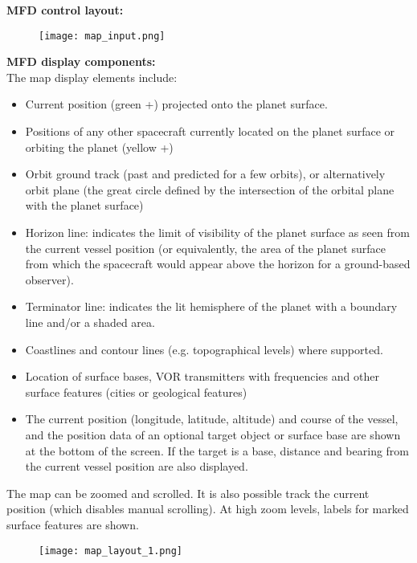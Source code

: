 \documentclass[Orbiter User Manual.tex]{subfiles}
\begin{document}
\noindent
\textbf{MFD control layout:}

\begin{figure}[H]
  \centering
  \texttt{[image: map\_input.png]}
\end{figure}

\noindent
\textbf{MFD display components:}\\
The map display elements include:

\begin{itemize}
\item Current position (green +) projected onto the planet surface.
\item Positions of any other spacecraft currently located on the planet surface or orbiting the planet (yellow +)
\item Orbit ground track (past and predicted for a few orbits), or alternatively orbit plane (the great circle defined by the intersection of the orbital plane with the planet surface)
\item Horizon line: indicates the limit of visibility of the planet surface as seen from the current vessel position (or equivalently, the area of the planet surface from which the spacecraft would appear above the horizon for a ground-based observer).
\item Terminator line: indicates the lit hemisphere of the planet with a boundary line and/or a shaded area.
\item Coastlines and contour lines (e.g. topographical levels) where supported.
\item Location of surface bases, VOR transmitters with frequencies and other surface features (cities or geological features)
\item The current position (longitude, latitude, altitude) and course of the vessel, and the position data of an optional target object or surface base are shown at the bottom of the screen. If the target is a base, distance and bearing from the current vessel position are also displayed.
\end{itemize}

\noindent
The map can be zoomed and scrolled. It is also possible track the current position (which disables manual scrolling). At high zoom levels, labels for marked surface features are shown.

\begin{figure}[H]
  \centering
  \texttt{[image: map\_layout\_1.png]}
\end{figure}
\end{document}
